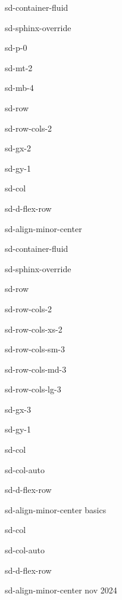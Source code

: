 \documentclass[letterpaper,10pt,italian]{jupyterBook}
\begin{document}
\sphinxstepscope

\begin{sphinxuseclass}{sd-container-fluid}
\begin{sphinxuseclass}{sd-sphinx-override}
\begin{sphinxuseclass}{sd-p-0}
\begin{sphinxuseclass}{sd-mt-2}
\begin{sphinxuseclass}{sd-mb-4}
\begin{sphinxuseclass}{sd-row}
\begin{sphinxuseclass}{sd-row-cols-2}
\begin{sphinxuseclass}{sd-gx-2}
\begin{sphinxuseclass}{sd-gy-1}
\begin{sphinxuseclass}{sd-col}
\begin{sphinxuseclass}{sd-d-flex-row}
\begin{sphinxuseclass}{sd-align-minor-center}
\begin{sphinxuseclass}{sd-container-fluid}
\begin{sphinxuseclass}{sd-sphinx-override}
\begin{sphinxuseclass}{sd-row}
\begin{sphinxuseclass}{sd-row-cols-2}
\begin{sphinxuseclass}{sd-row-cols-xs-2}
\begin{sphinxuseclass}{sd-row-cols-sm-3}
\begin{sphinxuseclass}{sd-row-cols-md-3}
\begin{sphinxuseclass}{sd-row-cols-lg-3}
\begin{sphinxuseclass}{sd-gx-3}
\begin{sphinxuseclass}{sd-gy-1}
\begin{sphinxuseclass}{sd-col}
\begin{sphinxuseclass}{sd-col-auto}
\begin{sphinxuseclass}{sd-d-flex-row}
\begin{sphinxuseclass}{sd-align-minor-center}
\sphinxAtStartPar
basics

\end{sphinxuseclass}
\end{sphinxuseclass}
\end{sphinxuseclass}
\end{sphinxuseclass}
\begin{sphinxuseclass}{sd-col}
\begin{sphinxuseclass}{sd-col-auto}
\begin{sphinxuseclass}{sd-d-flex-row}
\begin{sphinxuseclass}{sd-align-minor-center}
 nov 2024


\end{sphinxuseclass}
\end{sphinxuseclass}
\end{sphinxuseclass}
\end{sphinxuseclass}
\end{sphinxuseclass}
\end{sphinxuseclass}
\end{sphinxuseclass}
\end{sphinxuseclass}
\end{sphinxuseclass}
\end{sphinxuseclass}
\end{sphinxuseclass}
\end{sphinxuseclass}
\end{sphinxuseclass}
\end{sphinxuseclass}
\end{sphinxuseclass}
\end{sphinxuseclass}
\end{sphinxuseclass}
\end{sphinxuseclass}
\end{sphinxuseclass}
\end{sphinxuseclass}
\end{sphinxuseclass}
\end{sphinxuseclass}
\end{sphinxuseclass}
\end{sphinxuseclass}
\end{sphinxuseclass}
\end{sphinxuseclass}
\end{document}
